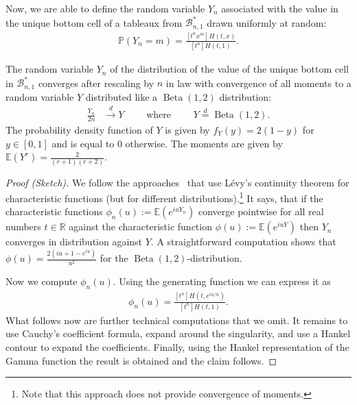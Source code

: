 \documentclass[a4paper,UKenglish,cleveref, autoref, thm-restate]{lipics-v2021}
\newcommand{\Bc}{\mathcal{B}}
\newcommand{\E}{\mathbb{E}}
\begin{document}
Now, we are able to define the random variable $Y_n$ associated with the value in the unique bottom cell of a tableaux from $\Bc^*_{n,1}$ drawn uniformly at random:
\begin{align*}
    \mathbb{P}(Y_n=m) = \frac{[t^{n} x^m]H(t,x)}{[t^{n}]H(t,1)}.
\end{align*}

\begin{theorem}\label{theo:Yn_valueBn1}
    The random variable $Y_n$ of the distribution of the value of the unique bottom cell in $\mathcal{B}^*_{n,1}$ converges after rescaling by $n$ in law with convergence of all moments to a random variable $Y$ distributed like a $\operatorname{Beta}(1,2)$ distribution:
    \begin{align*}
        \frac{Y_n}{2n} &\stackrel{d}{\to} Y  \qquad \text{ where } \qquad
        Y \stackrel{d}{=}\operatorname{Beta}(1,2).
    \end{align*}
    The probability density function of $Y$ is given by $f_Y(y) = 2(1-y)$ for $y \in [0,1]$ and is equal to $0$ otherwise. 
    The moments are given by $\E(Y^r) = \frac{2}{(r+1)(r+2)}$.
\end{theorem}

\begin{proof}[Proof (Sketch)]
    We follow the approaches~\cite{DrmotaSoria1997Images,Wallner2020Halfnormal} that use Lévy's continuity theorem for characteristic functions (but for different distributions).\footnote{Note that this approach does not provide convergence of moments.} 
    It says, that if the characteristic functions $\phi_n(u) := \E(e^{i u Y_n})$ converge pointwise for all real numbers $t \in \mathbb{R}$ against the characteristic function $\phi(u) := \E(e^{i u Y})$ then $Y_n$ converges in distribution against $Y$. 
    A straightforward computation shows that $\phi(u) = \frac{2(iu + 1 - e^{iu})}{u^2}$ for the $\operatorname{Beta}(1,2)$-distribution.

    Now we compute $\phi_n(u)$.
    Using the generating function we can express it as 
    \begin{align*}
        \phi_n(u) = \frac{[t^n] H(t, e^{i u/n}) }{[t^n] H(t,1)}.
    \end{align*}
    What follows now are further technical computations that we omit. 
    It remains to use Cauchy's coefficient formula, expand around the singularity, and use a Hankel contour to expand the coefficients. Finally, using the Hankel representation of the Gamma function the result is obtained and the claim follows.
\end{proof}
\end{document}
